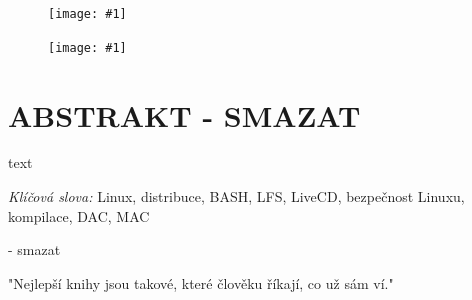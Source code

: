 \documentclass[a4paper,12pt,twoside,BCOR=10mm]{article}
\newcommand{\nm}[1]{\clearpage\section*{\uppercase{#1}}}  %
\newcommand{\obr}[3]{%
  \begin{figure}[h]
  \center\texttt{[image: \#1]}
  \caption{#3}
  \end{figure}
  }
\newcommand{\ofZadani}[2]{%
  \begin{figure}[h]
  \center\texttt{[image: \#1]}
  \end{figure}
  }
\begin{document}
\clearpage
\thispagestyle{empty}
\ofZadani{./img/ofZadani/ofZadaniStr1.png}{Oficiální zadání bakalářské práce strana 1}
\clearpage
\thispagestyle{empty}
\ofZadani{./img/ofZadani/ofZadaniStr2.png}{Oficiální zadání bakalářské práce strana 2}
\clearpage
\thispagestyle{empty}
\voffset=-1.61cm\evensidemargin=0.96cm\oddsidemargin=0.96cm\headsep=1cm\headheight=0.5cm\setlength{\parskip}{3pt}\textheight=248mm\textwidth=155mm
\nm{\uppercase{Abstrakt - smazat}}
\vspace{1cm}
text
\vspace{1cm}

\emph{Klíčová slova:} Linux, distribuce, BASH, LFS, LiveCD, bezpečnost Linuxu, kompilace, DAC, MAC
\vspace{2cm}

\clearpage
\thispagestyle{empty}
 - smazat

\vspace{3cm}
"Nejlepší knihy jsou takové, které člověku říkají, co už sám ví."\\
\end{document}
